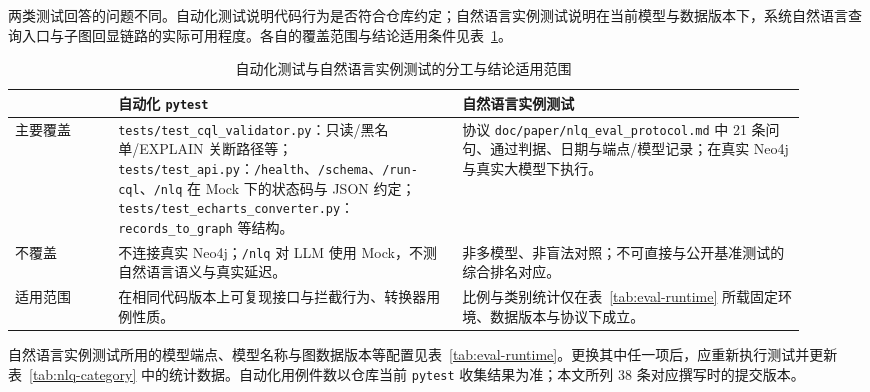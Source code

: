 \documentclass[12pt,a4paper]{article}
\begin{document}
两类测试回答的问题不同。自动化测试说明代码行为是否符合仓库约定；自然语言实例测试说明在当前模型与数据版本下，系统自然语言查询入口与子图回显链路的实际可用程度。各自的覆盖范围与结论适用条件见表~\ref{tab:test-scope}。

\begin{table}[H]
    \centering
    \captionsetup{justification=centering, singlelinecheck=false}
    \caption[自动化测试与自然语言实例测试分工表]{自动化测试与自然语言实例测试的分工与结论适用范围}
    \label{tab:test-scope}
    \small
    \setlength{\tabcolsep}{4pt}
    \begin{tabular}{>{\RaggedRight\arraybackslash}p{0.12\linewidth} >{\RaggedRight\arraybackslash}p{0.4\linewidth} >{\RaggedRight\arraybackslash}p{0.4\linewidth}}
        \toprule
        & \textbf{自动化 \texttt{pytest}} & \textbf{自然语言实例测试} \\
        \midrule
        主要覆盖 & \texttt{tests/test\_cql\_validator.py}：只读/黑名单/EXPLAIN 关断路径等；\texttt{tests/test\_api.py}：\texttt{/health}、\texttt{/schema}、\texttt{/run-cql}、\texttt{/nlq} 在 Mock 下的状态码与 JSON 约定；\texttt{tests/test\_echarts\_converter.py}：\texttt{records\_to\_graph} 等结构。 & 协议 \texttt{doc/paper/nlq\_eval\_protocol.md} 中 21 条问句、通过判据、日期与端点/模型记录；在真实 Neo4j 与真实大模型下执行。 \\
        不覆盖 & 不连接真实 Neo4j；\texttt{/nlq} 对 LLM 使用 Mock，不测自然语言语义与真实延迟。 & 非多模型、非盲法对照；不可直接与公开基准测试的综合排名对应。 \\
        适用范围 & 在相同代码版本上可复现接口与拦截行为、转换器用例性质。 & 比例与类别统计仅在表~\ref{tab:eval-runtime} 所载固定环境、数据版本与协议下成立。 \\
        \bottomrule
    \end{tabular}
\end{table}

自然语言实例测试所用的模型端点、模型名称与图数据版本等配置见表~\ref{tab:eval-runtime}。更换其中任一项后，应重新执行测试并更新表~\ref{tab:nlq-category} 中的统计数据。自动化用例件数以仓库当前 \texttt{pytest} 收集结果为准；本文所列 38 条对应撰写时的提交版本。
\end{document}
